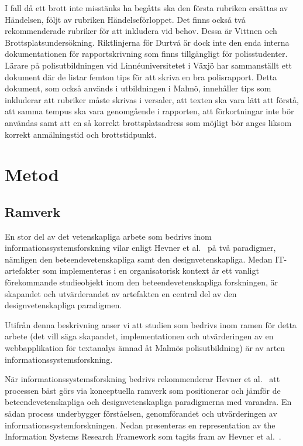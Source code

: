 \documentclass[swedish]{maucsthesis}
\begin{document}
I fall då ett brott inte misstänks ha begåtts ska den första rubriken ersättas
av Händelsen, följt av rubriken Händelseförloppet. Det finns också två
rekommenderade rubriker för att inkludera vid behov. Dessa är Vittnen och
Brottsplatsundersökning. Riktlinjerna för Durtvå är dock inte den enda interna
dokumentationen för rapportskrivning som finns tillgängligt för polisstudenter.
Lärare på polisutbildningen vid Linnéuniversitetet i Växjö har sammanställt ett
dokument \cite{per:2018} där de listar femton tips för att skriva en bra polisrapport. Detta
dokument, som också används i utbildningen i Malmö, innehåller tips som
inkluderar att rubriker måste skrivas i versaler, att texten ska vara lätt att
förstå, att samma tempus ska vara genomgående i rapporten, att förkortningar
inte bör användas samt att en så korrekt brottsplatsadress som möjligt bör
anges liksom korrekt anmälningstid och brottstidpunkt.

\section{Metod}

\subsection{Ramverk}\label{ramverk}

En stor del av det vetenskapliga arbete som bedrivs inom informationssystemsforskning vilar enligt Hevner et al.~\cite{hevner:2004} på två paradigmer, nämligen den beteendevetenskapliga samt den designvetenskapliga. Medan IT-artefakter som implementeras i en organisatorisk kontext är ett vanligt förekommande studieobjekt inom den beteendevetenskapliga forskningen, är skapandet och utvärderandet av artefakten en central del av den designvetenskapliga paradigmen.

Utifrån denna beskrivning anser vi att studien som bedrivs inom ramen för detta arbete (det vill säga skapandet, implementationen och utvärderingen av en webbapplikation för textanalys ämnad åt Malmös polisutbildning) är av arten informationssystemsforskning.

När informationssystemsforskning bedrivs rekommenderar Hevner et al.~\cite{hevner:2004} att processen bäst görs via konceptuella ramverk som positionerar och jämför de beteendevetenskapliga och designvetenskapliga paradigmerna med varandra. En sådan process underbygger förståelsen, genomförandet och utvärderingen av informationssystemforskningen.  Nedan presenteras en representation av the Information Systems Research Framework som tagits fram av Hevner et al.~\cite{hevner:2004}.
\end{document}
